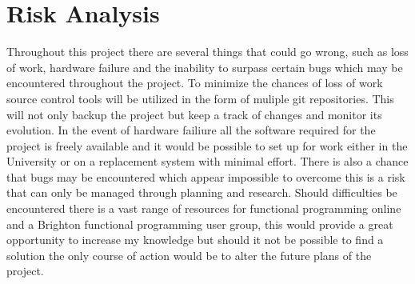 \documentclass[main.tex]{subfiles}
\begin{document}
\section{Risk Analysis} %
Throughout this project there are several things that could go wrong, such as  loss of work, hardware failure and the inability to surpass certain bugs which may be encountered throughout the project. To minimize the chances of loss of work source control tools will be utilized in the form of muliple git repositories. This will not only backup the project but keep a track of changes and monitor its evolution. In the event of hardware failiure all the software required for the project is freely available and it would be possible to set up for work either in the University or on a replacement system with minimal effort. There is also a chance that bugs may be encountered which appear impossible to overcome this is a risk that can only be managed through planning and research. Should difficulties be encountered there is a vast range of resources for functional programming online and a Brighton functional programming user group, this would provide a great opportunity to increase my knowledge but should it not be possible to find a solution the only course of action would be to alter the future plans of the project.
\end{document}

